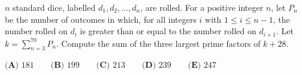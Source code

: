 $n$ standard dice, labelled $d_1,d_2,\dots,d_n$, are rolled. For a positive integer $n$, let $P_n$ be the number of outcomes in which, for all integers $i$ with $1\le i\le n-1$, the number rolled on $d_i$ is greater than or equal to the number rolled on $d_{i+1}$. Let $k=\displaystyle\sum_{n=3}^{70}P_n$. Compute the sum of the three largest prime factors of $k+28$.

$\textbf{(A) }181\qquad\textbf{(B) }199\qquad\textbf{(C) }213\qquad\textbf{(D) }239\qquad\textbf{(E) }247$

